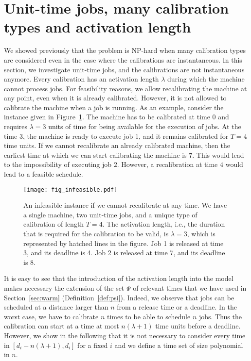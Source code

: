 \section{Unit-time jobs, many calibration types and activation length}
\label{sec:act_unit}

We showed previously that the problem is NP-hard when many calibration types are considered even in the case where the calibrations are instantaneous. In this section, we investigate unit-time jobs, and the calibrations are not instantaneous anymore. Every calibration has an activation length $\lambda$ during which the machine cannot process jobs. For feasibility reasons, we allow recalibrating the machine at any point, even when it is already calibrated. However, it is not allowed to calibrate the machine when a job is running. As an example, consider the instance given in Figure~\ref{fig:infeasible}.  The machine has to be calibrated at time 0 and requires $\lambda=3$ units of time for being available for the execution of jobs. At the time $3$, the machine is ready to execute job 1, and it remains calibrated for $T=4$ time units. If we cannot recalibrate an already calibrated machine, then the earliest time at which we can start calibrating the machine is $7$. This would lead to the impossibility of executing job $2$. However, a recalibration at time $4$ would lead to a feasible schedule.
\begin{figure}[ht]
\centering
\texttt{[image: fig\_infeasible.pdf]}
\caption{An infeasible instance if we cannot recalibrate at any time. We have a single machine, two unit-time jobs, and a unique type of calibration of length $T=4$. The activation length, i.e., the duration that is required for the calibration to be valid, is $\lambda=3$, which is represented by hatched lines in the figure. Job 1 is released at time 3, and its deadline is 4. Job 2 is released at time 7, and its deadline is 8.}
\label{fig:infeasible}
\end{figure}


It is easy to see that the introduction of the activation length into the model makes necessary the extension of the set $\Psi$ of relevant times that we have used in Section~\ref{sec:warm} (Definition~\ref{def:psi}). Indeed, we observe that jobs can be scheduled at a distance larger than $n$ from a release time or a deadline. 
In the worst case, we have to calibrate $n$ times to be able to schedule $n$ jobs. Thus the calibration can start at a time at most $n(\lambda +1)$ time units before a deadline. However, we show in the following that it is not necessary to consider every time in $[d_i-n(\lambda +1),d_i]$ for a fixed $i$ and we define a time set of size polynomial in $n$.




